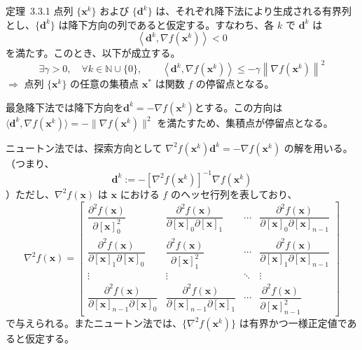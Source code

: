 \documentclass[a4j]{jarticle}
\begin{document}
\begin{itembox}[l]{定理~3.3.1}
  点列 $\{\bm{x}^k\}$ および $\{\bm{d}^k\}$ は、それぞれ降下法により生成される有界列とし、$\{\bm{d}^k\}$ は降下方向の列であると仮定する。すなわち、各 $k$ で $\bm{d}^k$ は
  \[
    \left\langle \bm{d}^k,\nabla f(\bm{x}^k)\right\rangle<0
  \]
  を満たす。このとき、以下が成立する。
  \[
    \exists\gamma>0,\quad\forall k\in\mathbb{N}\cup\{0\},\qquad
    \left\langle \bm{d}^k,\nabla f(\bm{x}^k)\right\rangle
    \le -\gamma\left\|\nabla f(\bm{x}^k)\right\|^2
  \]
  $\Longrightarrow$ 点列 $\{\bm{x}^k\}$ の任意の集積点 $\bm{x}^*$ は関数 $f$ の停留点となる。
\end{itembox}

最急降下法では降下方向を$\bm{d}^k=-\nabla f(\bm{x}^k)$とする。この方向は $\langle\bm{d}^k,\nabla f(\bm{x}^k)\rangle=-\|\nabla f(\bm{x}^k)\|^2$ を満たすため、集積点が停留点となる。

ニュートン法では、探索方向として $\nabla^2 f(\bm{x}^k)\bm{d}^k=-\nabla f(\bm{x}^k)$ の解を用いる。（つまり、
\[
  \bm{d}^k:=-\left[\nabla^2 f(\bm{x}^k)\right]^{-1}\nabla f(\bm{x}^k)
\]
）ただし、$\nabla^2 f(\bm{x})$ は $\bm{x}$ における $f$ のヘッセ行列を表しており、
\[
  \nabla^2 f(\bm{x})=
  \begin{bmatrix}
    \dfrac{\partial^2 f(\bm{x})}{\partial [\bm{x}]_0^2}
    & \dfrac{\partial^2 f(\bm{x})}{\partial [\bm{x}]_0\partial [\bm{x}]_1}
    & \cdots
    & \dfrac{\partial^2 f(\bm{x})}{\partial [\bm{x}]_0\partial [\bm{x}]_{n-1}} \\[1.2em]
    \dfrac{\partial^2 f(\bm{x})}{\partial [\bm{x}]_1\partial [\bm{x}]_0}
    & \dfrac{\partial^2 f(\bm{x})}{\partial [\bm{x}]_1^2}
    & \cdots
    & \dfrac{\partial^2 f(\bm{x})}{\partial [\bm{x}]_1\partial [\bm{x}]_{n-1}} \\[1.2em]
    \vdots & \vdots & \ddots & \vdots \\[0.6em]
    \dfrac{\partial^2 f(\bm{x})}{\partial [\bm{x}]_{n-1}\partial [\bm{x}]_0}
    & \dfrac{\partial^2 f(\bm{x})}{\partial [\bm{x}]_{n-1}\partial [\bm{x}]_1}
    & \cdots
    & \dfrac{\partial^2 f(\bm{x})}{\partial [\bm{x}]_{n-1}^2}
  \end{bmatrix}
\]
で与えられる。またニュートン法では、$\{\nabla^2 f(\bm{x}^k)\}$ は有界かつ一様正定値であると仮定する。
\end{document}
